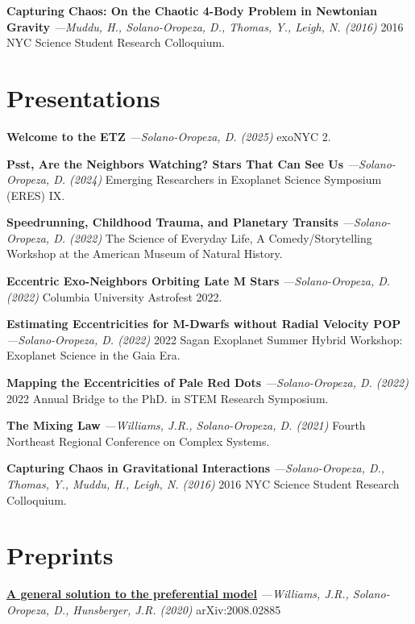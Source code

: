 \documentclass[a4paper,11pt]{article}
\begin{document}
    \textbf{Capturing Chaos: On the Chaotic 4-Body Problem in Newtonian Gravity} \textit{—Muddu, H., Solano-Oropeza, D., Thomas, Y., Leigh, N. (2016)} 2016 NYC Science Student Research Colloquium.
    
\section{Presentations}

    \textbf{Welcome to the ETZ} \textit{—Solano-Oropeza, D. (2025)} exoNYC 2. \vspace{1.5mm}

    \textbf{Psst, Are the Neighbors Watching? Stars That Can See Us} \textit{—Solano-Oropeza, D. (2024)} Emerging Researchers in Exoplanet Science Symposium (ERES) IX.
    \vspace{1.5mm}
    
    \textbf{Speedrunning, Childhood Trauma, and Planetary Transits} \textit{—Solano-Oropeza, D. (2022)} The Science of Everyday Life, A Comedy/Storytelling Workshop at the American Museum of Natural History.
    \vspace{1.5mm}

    \textbf{Eccentric Exo-Neighbors Orbiting Late M Stars} \textit{—Solano-Oropeza, D. (2022)} Columbia University Astrofest 2022.
    \vspace{1.5mm}
    
    \textbf{Estimating Eccentricities for M-Dwarfs without Radial Velocity POP} \textit{—Solano-Oropeza, D. (2022)} 2022 Sagan Exoplanet Summer Hybrid Workshop: Exoplanet Science in the Gaia Era.
    \vspace{1.5mm}

    \textbf{Mapping the Eccentricities of Pale Red Dots} \textit{—Solano-Oropeza, D. (2022)} 2022 Annual Bridge to the PhD. in STEM Research Symposium.
    \vspace{1.5mm}
    
    \textbf{The Mixing Law} \textit{—Williams, J.R., Solano-Oropeza, D. (2021)} Fourth Northeast Regional Conference on Complex Systems.
    \vspace{1.5mm}
    
    \textbf{Capturing Chaos in Gravitational Interactions} \textit{—Solano-Oropeza, D., Thomas, Y., Muddu, H., Leigh, N. (2016)} 2016 NYC Science Student Research Colloquium.
    
\section{Preprints}
    {\href{https://arxiv.org/abs/2008.02885}{\textbf{A general solution to the preferential model}}} \textit{—Williams, J.R., Solano-Oropeza, D., Hunsberger, J.R. (2020)} arXiv:2008.02885
\end{document}
